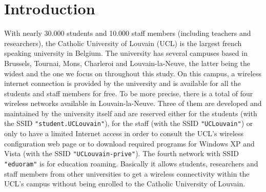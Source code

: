 
\chapter{Introduction} %

\label{Chapter1} %



With nearly 30.000 students and 10.000 staff members (including teachers and researchers), the Catholic University of Louvain (UCL) is the largest french speaking university in Belgium. The university has several campuses based in Brussels, Tournai, Mons, Charleroi and Louvain-la-Neuve, the latter being the widest and the one we focus on throughout this study. On this campus, a wireless internet connection is provided by the university and is available for all the students and staff members for free. To be more precise, there is a total of four wireless networks available in Louvain-la-Neuve. Three of them are developed and maintained by the university itself and are reserved either for the students (with the SSID \texttt{"student.UCLouvain"}), for the staff (with the SSID \texttt{"UCLouvain"}) or only to have a limited Internet access in order to consult the UCL's wireless configuration web page or to download required programs  for Windows XP and Vista (with the SSID \texttt{"UCLouvain-prive"}). The fourth network with SSID \texttt{"eduoram"} is for education roaming. Basically it allows students, researchers and staff members from other universities to get a wireless connectivity within the UCL's campus without being enrolled to the Catholic University of Louvain.

